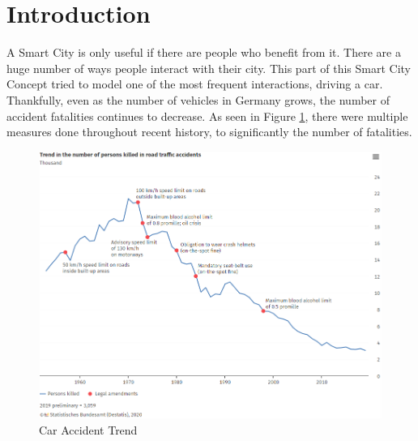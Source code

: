 \section{Introduction}\label{6sec:intro}


A Smart City is only useful if there are people who benefit from it.
There are a huge number of ways people interact with their city.
This part of this Smart City Concept tried to model 
one of the most frequent interactions, driving a car.
Thankfully, even as the number of vehicles in Germany grows\cite{carStat},
the number of accident fatalities continues to decrease.\cite{destatisCar}
As seen in Figure \ref{6fig:trend}, 
there were multiple measures done throughout recent history, 
to significantly the number of fatalities. 

\begin{figure}[H]
  \includegraphics[width=0.9\linewidth]{chapters/chapter6_bruno/Figures/trendV2.png}
  \caption{Car Accident Trend \cite{destatisCar}}
  \label{6fig:trend}
\end{figure}

